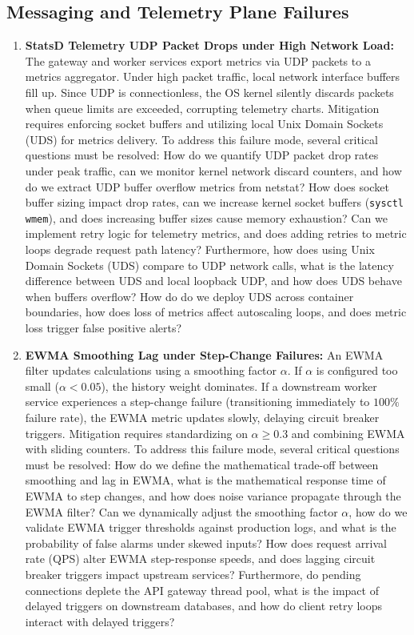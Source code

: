 \documentclass[11pt,a4paper]{article}
\theoremstyle{plain}
\theoremstyle{definition}
\theoremstyle{remark}
\begin{document}
\subsection{Messaging and Telemetry Plane Failures}
\begin{enumerate}[label=\textbf{MF\arabic*.}]
    \item \textbf{StatsD Telemetry UDP Packet Drops under High Network Load:} 
    The gateway and worker services export metrics via UDP packets to a metrics aggregator. Under high packet traffic, local network interface buffers fill up. Since UDP is connectionless, the OS kernel silently discards packets when queue limits are exceeded, corrupting telemetry charts.
    Mitigation requires enforcing socket buffers and utilizing local Unix Domain Sockets (UDS) for metrics delivery.
    To address this failure mode, several critical questions must be resolved: How do we quantify UDP packet drop rates under peak traffic, can we monitor kernel network discard counters, and how do we extract UDP buffer overflow metrics from netstat? How does socket buffer sizing impact drop rates, can we increase kernel socket buffers (\texttt{sysctl wmem}), and does increasing buffer sizes cause memory exhaustion? Can we implement retry logic for telemetry metrics, and does adding retries to metric loops degrade request path latency? Furthermore, how does using Unix Domain Sockets (UDS) compare to UDP network calls, what is the latency difference between UDS and local loopback UDP, and how does UDS behave when buffers overflow? How do do we deploy UDS across container boundaries, how does loss of metrics affect autoscaling loops, and does metric loss trigger false positive alerts?

    \item \textbf{EWMA Smoothing Lag under Step-Change Failures:} 
    An EWMA filter updates calculations using a smoothing factor $\alpha$. If $\alpha$ is configured too small ($\alpha < 0.05$), the history weight dominates. If a downstream worker service experiences a step-change failure (transitioning immediately to $100\%$ failure rate), the EWMA metric updates slowly, delaying circuit breaker triggers.
    Mitigation requires standardizing on $\alpha \ge 0.3$ and combining EWMA with sliding counters.
    To address this failure mode, several critical questions must be resolved: How do we define the mathematical trade-off between smoothing and lag in EWMA, what is the mathematical response time of EWMA to step changes, and how does noise variance propagate through the EWMA filter? Can we dynamically adjust the smoothing factor $\alpha$, how do we validate EWMA trigger thresholds against production logs, and what is the probability of false alarms under skewed inputs? How does request arrival rate (QPS) alter EWMA step-response speeds, and does lagging circuit breaker triggers impact upstream services? Furthermore, do pending connections deplete the API gateway thread pool, what is the impact of delayed triggers on downstream databases, and how do client retry loops interact with delayed triggers?


\end{enumerate}
\end{document}
